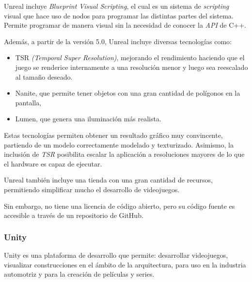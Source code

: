 \documentclass[a4paper,11pt]{book}
\begin{document}
\bigskip

Unreal incluye \textit{Blueprint Visual Scripting}, el cual es un sistema de \textit{scripting} visual que hace uso de nodos para programar las distintas partes del sistema. Permite programar de manera visual sin la necesidad de conocer la \textit{API} de C++.

\bigskip

Además, a partir de la versión 5.0, Unreal incluye diversas tecnologías como: 

\begin{itemize}
   \item TSR \textit{(Temporal Super Resolution)}, mejorando el rendimiento haciendo que el juego se renderice internamente a una resolución menor y luego sea reescalado al tamaño deseado.
   \item Nanite, que permite tener objetos con una gran cantidad de polígonos en la pantalla, 
   \item Lumen, que genera una iluminación más realista. %
\end{itemize}

Estas tecnologías permiten obtener un resultado gráfico muy convincente, partiendo de un modelo correctamente modelado y texturizado. Asimismo, la inclusión de \textit{TSR} posibilita escalar la aplicación a resoluciones mayores de lo que el hardware es capaz de ejecutar.

\bigskip

Unreal también incluye una tienda con una gran cantidad de recursos, permitiendo simplificar mucho el desarrollo de videojuegos.

\bigskip

Sin embargo, no tiene una licencia de código abierto, pero su código fuente es accesible a través de un repositorio de GitHub. %

\subsubsection{Unity}

Unity \cite{unity} es una plataforma de desarrollo que permite: desarrollar videojuegos, visualizar construcciones en el ámbito de la arquitectura, para uso en la industria automotriz y para la creación de películas y series.
\end{document}
